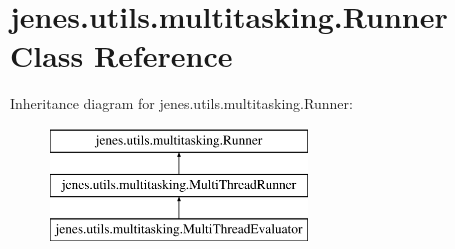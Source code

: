 \hypertarget{classjenes_1_1utils_1_1multitasking_1_1_runner}{\section{jenes.\-utils.\-multitasking.\-Runner Class Reference}
\label{classjenes_1_1utils_1_1multitasking_1_1_runner}
}
Inheritance diagram for jenes.\-utils.\-multitasking.\-Runner\-:\begin{figure}[H]
\begin{center}
\leavevmode
\includegraphics[height=3.000000cm]{classjenes_1_1utils_1_1multitasking_1_1_runner}
\end{center}
\end{figure}
